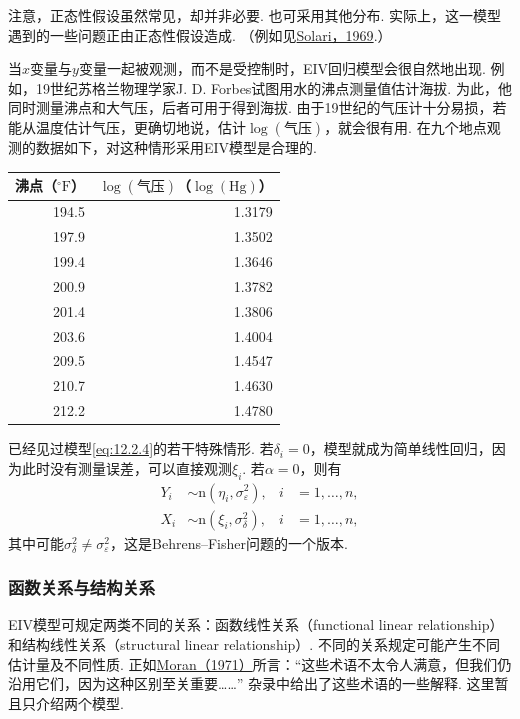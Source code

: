 注意，正态性假设虽然常见，却并非必要. 也可采用其他分布. 实际上，这一模型遇到的一些问题正由正态性假设造成. （例如见\hyperref[bib:source295]{Solari，1969}.）

\begin{example}[估计大气压]\label{ex:12.2.1}
当$x$变量与$y$变量一起被观测，而不是受控制时，EIV回归模型会很自然地出现. 例如，19世纪苏格兰物理学家J. D. Forbes试图用水的沸点测量值估计海拔. 为此，他同时测量沸点和大气压，后者可用于得到海拔. 由于19世纪的气压计十分易损，若能从温度估计气压，更确切地说，估计$\log(\text{气压})$，就会很有用. 在九个地点观测的数据如下，对这种情形采用EIV模型是合理的.
\begin{center}\begin{tabular}{rr}\toprule
沸点（$^\circ\mathrm F$）&$\log(\text{气压})$（$\log(\mathrm{Hg})$）\\\midrule
194.5&1.3179\\197.9&1.3502\\199.4&1.3646\\200.9&1.3782\\201.4&1.3806\\203.6&1.4004\\209.5&1.4547\\210.7&1.4630\\212.2&1.4780\\\bottomrule
\end{tabular}\end{center}
\end{example}

已经见过模型\eqref{eq:12.2.4}的若干特殊情形. 若$\delta_i=0$，模型就成为简单线性回归，因为此时没有测量误差，可以直接观测$\xi_i$. 若$\alpha=0$，则有
$$\begin{aligned}Y_i&\sim\mathrm n(\eta_i,\sigma_\varepsilon^2),&i&=1,\ldots,n,\\
X_i&\sim\mathrm n(\xi_i,\sigma_\delta^2),&i&=1,\ldots,n,
\end{aligned}$$
其中可能$\sigma_\delta^2\ne\sigma_\varepsilon^2$，这是Behrens--Fisher问题的一个版本.

\subsubsection{函数关系与结构关系}\label{sec:12.2.1}
EIV模型可规定两类不同的关系：函数线性关系（functional linear relationship）和结构线性关系（structural linear relationship）. 不同的关系规定可能产生不同估计量及不同性质. 正如\hyperref[bib:source222]{Moran（1971）}所言：“这些术语不太令人满意，但我们仍沿用它们，因为这种区别至关重要……” 杂录中给出了这些术语的一些解释. 这里暂且只介绍两个模型.


